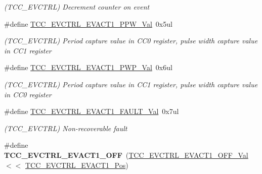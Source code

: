 \begin{DoxyCompactItemize}
\begin{DoxyCompactList}\small\item\em (T\+C\+C\+\_\+\+E\+V\+C\+T\+R\+L) Decrement counter on event \end{DoxyCompactList}\item 
\hypertarget{group___s_a_m_l21___t_c_c_gad65bf5f8cc669d5c2833e610381ede16}{}\#define \hyperlink{group___s_a_m_l21___t_c_c_gad65bf5f8cc669d5c2833e610381ede16}{T\+C\+C\+\_\+\+E\+V\+C\+T\+R\+L\+\_\+\+E\+V\+A\+C\+T1\+\_\+\+P\+P\+W\+\_\+\+Val}~0x5ul\label{group___s_a_m_l21___t_c_c_gad65bf5f8cc669d5c2833e610381ede16}

\begin{DoxyCompactList}\small\item\em (T\+C\+C\+\_\+\+E\+V\+C\+T\+R\+L) Period capture value in C\+C0 register, pulse width capture value in C\+C1 register \end{DoxyCompactList}\item 
\hypertarget{group___s_a_m_l21___t_c_c_ga3c8260261d3246656b53ff1a1df3dbd4}{}\#define \hyperlink{group___s_a_m_l21___t_c_c_ga3c8260261d3246656b53ff1a1df3dbd4}{T\+C\+C\+\_\+\+E\+V\+C\+T\+R\+L\+\_\+\+E\+V\+A\+C\+T1\+\_\+\+P\+W\+P\+\_\+\+Val}~0x6ul\label{group___s_a_m_l21___t_c_c_ga3c8260261d3246656b53ff1a1df3dbd4}

\begin{DoxyCompactList}\small\item\em (T\+C\+C\+\_\+\+E\+V\+C\+T\+R\+L) Period capture value in C\+C1 register, pulse width capture value in C\+C0 register \end{DoxyCompactList}\item 
\hypertarget{group___s_a_m_l21___t_c_c_ga3de4e07c14fc85cfbb1f76b8f5049f46}{}\#define \hyperlink{group___s_a_m_l21___t_c_c_ga3de4e07c14fc85cfbb1f76b8f5049f46}{T\+C\+C\+\_\+\+E\+V\+C\+T\+R\+L\+\_\+\+E\+V\+A\+C\+T1\+\_\+\+F\+A\+U\+L\+T\+\_\+\+Val}~0x7ul\label{group___s_a_m_l21___t_c_c_ga3de4e07c14fc85cfbb1f76b8f5049f46}

\begin{DoxyCompactList}\small\item\em (T\+C\+C\+\_\+\+E\+V\+C\+T\+R\+L) Non-\/recoverable fault \end{DoxyCompactList}\item 
\hypertarget{group___s_a_m_l21___t_c_c_ga743ba7548cf4651a5f3148d77ccbccb7}{}\#define {\bfseries T\+C\+C\+\_\+\+E\+V\+C\+T\+R\+L\+\_\+\+E\+V\+A\+C\+T1\+\_\+\+O\+F\+F}~(\hyperlink{group___s_a_m_l21___t_c_c_ga49597ad47ecd4badc3bc7d5f4f2ff7e5}{T\+C\+C\+\_\+\+E\+V\+C\+T\+R\+L\+\_\+\+E\+V\+A\+C\+T1\+\_\+\+O\+F\+F\+\_\+\+Val}     $<$$<$ \hyperlink{group___s_a_m_l21___t_c_c_gada1f071c882b1c68121a6d6db44527e2}{T\+C\+C\+\_\+\+E\+V\+C\+T\+R\+L\+\_\+\+E\+V\+A\+C\+T1\+\_\+\+Pos})\label{group___s_a_m_l21___t_c_c_ga743ba7548cf4651a5f3148d77ccbccb7}


\end{DoxyCompactItemize}
